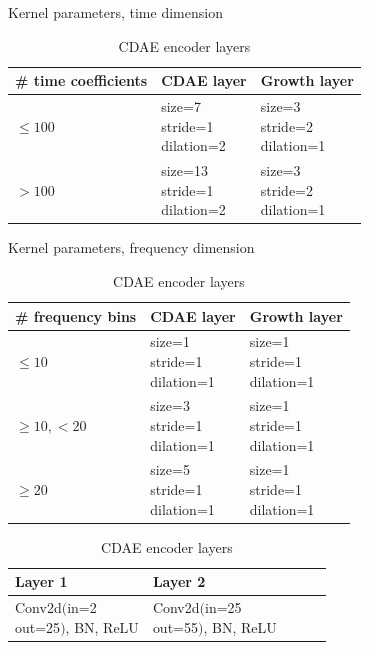 \documentclass[report.tex]{subfiles}
\begin{document}
\begin{table}[ht]
	\centering
	\caption{Kernel parameters, time dimension}
	\label{table:convtable1}
	\begin{tabular}{ |l|l|l| }
	 \hline
		\# time coefficients & CDAE layer & Growth layer \\
	 \hline
	 \hline
		$\le 100$ & \makecell[l]{size=7\\stride=1\\dilation=2} & \makecell[l]{size=3\\stride=2\\dilation=1} \\
	 \hline
		$> 100$ & \makecell[l]{size=13\\stride=1\\dilation=2} & \makecell[l]{size=3\\stride=2\\dilation=1} \\
	 \hline
\end{tabular}
	\vspace{1em}
	\caption{Kernel parameters, frequency dimension}
	\label{table:convtable2}
\begin{tabular}{ |l|l|l| }
	 \hline
		\# frequency bins & CDAE layer & Growth layer \\
	 \hline
	 \hline
		$\le 10$ & \makecell[l]{size=1\\stride=1\\dilation=1} & \makecell[l]{size=1\\stride=1\\dilation=1} \\
	 \hline
		$\ge 10, < 20$ & \makecell[l]{size=3\\stride=1\\dilation=1} & \makecell[l]{size=1\\stride=1\\dilation=1} \\
	 \hline
		$\ge 20$ & \makecell[l]{size=5\\stride=1\\dilation=1} & \makecell[l]{size=1\\stride=1\\dilation=1} \\
	 \hline
\end{tabular}
	\vspace{1em}
	\caption{CDAE encoder layers}
	\label{table:convtable3}
\begin{tabular}{ |l|l|l|l|l| }
	 \hline
		Layer 1 & Layer 2 \\
	 \hline
	 \hline
		Conv2d$\Big($\makecell[l]{in=2\\out=25}$\Big)$, BN, ReLU & Conv2d$\Big($\makecell[l]{in=25\\out=55}$\Big)$, BN, ReLU \\

\end{tabular}
\end{table}
\end{document}
